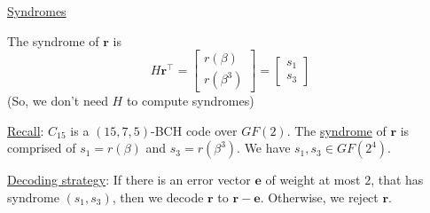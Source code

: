 \underline{Syndromes}

The syndrome of $ \bm{r} $ is
\[ H\bm{r}^\top=
    \begin{bmatrix}
        r(\beta) \\
        r(\beta^3)
    \end{bmatrix}=
    \begin{bmatrix}
        s_1 \\
        s_3
    \end{bmatrix} \]
(So, we don't need $ H $ to compute syndromes)

\underline{Recall}: $ C_{15} $ is a $ (15,7,5) $-BCH code over $ GF(2) $.
The \underline{syndrome} of $ \bm{r} $ is comprised of $ s_1=r(\beta) $
and $ s_3=r(\beta^3) $. We have $ s_1,s_3\in GF(2^4) $.

\underline{Decoding strategy}: If there is an error vector $ \bm{e} $
of weight at most $ 2 $, that has syndrome $ (s_1,s_3) $, then we decode
$ \bm{r} $ to $ \bm{r}-\bm{e} $. Otherwise, we reject $ \bm{r} $.

